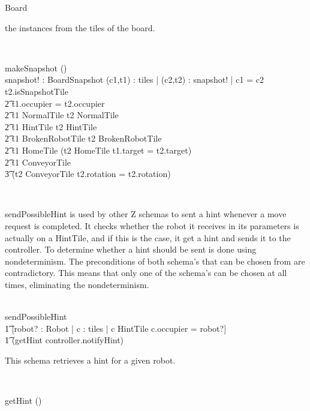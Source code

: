 \begin{class}{Board}
\begin{zpar}
the instances from the tiles of the board.
\end{zpar} \\
\begin{schema}{makeSnapshot}
\Delta() \\
snapshot! : BoardSnapshot
\where
\forall (c1,t1) : tiles | \exists (c2,t2) : snapshot! | c1 = c2 \wedge t2.isSnapshotTile \: \wedge \\ \t2
t1.occupier = t2.occupier \: \wedge \\ \t2
t1 \in NormalTile \Rightarrow t2 \in NormalTile \: \wedge \\ \t2
t1 \in HintTile \Rightarrow t2 \in HintTile \: \wedge \\ \t2
t1 \in BrokenRobotTile \Rightarrow t2 \in BrokenRobotTile \: \wedge \\ \t2
t1 \in HomeTile \Rightarrow (t2 \in HomeTile \wedge t1.target = t2.target) \: \wedge \\ \t2
t1 \in ConveyorTile \Rightarrow \\ \t3 (t2 \in ConveyorTile \wedge t2.rotation = t2.rotation)
\end{schema} \\
\begin{zpar}
sendPossibleHint is used by other Z schemas to sent a hint whenever
a move request is completed. It checks whether the robot it receives in its
parameters is actually on a HintTile, and if this is the case, it get a hint
and sends it to the controller.
To determine whether a hint should be sent is done using nondeterminism.
The preconditions of both schema's that can be chosen from are contradictory.
This means that only one of the schema's can be chosen at all times,
eliminating the nondeterminism.
\end{zpar} \\
sendPossibleHint \sdef [robot? : Robot | \\ \t2 \neg \exists c : \ran tiles | c \in HintTile \wedge c.occupier = robot?] \; \; [] \\ \t1
[robot? : Robot | \exists c : \ran tiles | c \in HintTile \wedge c.occupier = robot?] \; \; \wedge \\ \t1 (getHint \comp controller.notifyHint) \\
\znewpage
\begin{zpar}
This schema retrieves a hint for a given robot.
\end{zpar} \\
\begin{schema}{getHint}
\Delta() \\

\end{schema}
\end{class}
